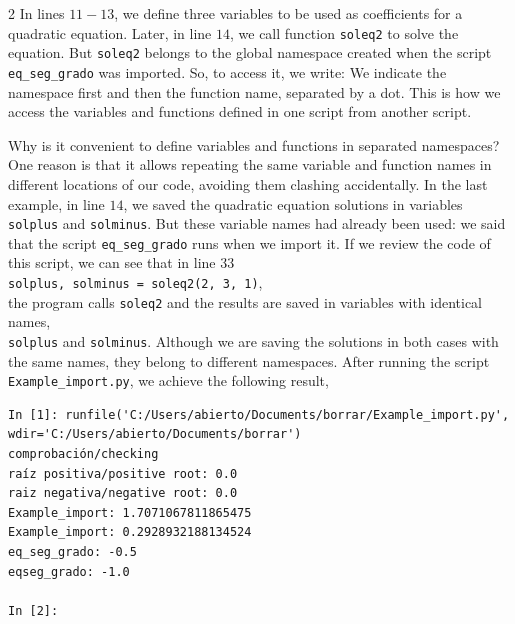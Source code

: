 \begin{paracol}{2}
In lines $11 - 13$, we define three variables to be used as coefficients for a quadratic equation. Later, in line $14$, we call function \texttt{soleq2} to solve the equation. But \texttt{soleq2} belongs to the global namespace created when the script \texttt{eq_seg_grado} was imported. So, to access it, we write:
We indicate the namespace first and then the function name, separated by a dot. This is how we access the variables and functions defined in one script from another script. 

Why is it convenient to define variables and functions in separated namespaces? One reason is that it allows repeating the same variable and function names in different locations of our code, avoiding them clashing accidentally. In the last example, in line $14$, we saved the quadratic equation solutions in variables \texttt{solplus} and \texttt{solminus}. But these variable names had already been used: we said that the script \texttt{eq_seg_grado} runs when we import it. If we review the code of this script, we can see that in line $33$\\ \texttt{solplus, solminus = soleq2(2, 3, 1)},\\ the program calls \texttt{soleq2} and the results are saved in variables with identical names,\\ \texttt{solplus} and \texttt{solminus}. Although we are saving the solutions in both cases with the same names, they belong to different namespaces. After running the script \texttt{Example_import.py}, we achieve the following result,   

\end{paracol}
\begin{verbatim}
In [1]: runfile('C:/Users/abierto/Documents/borrar/Example_import.py',
wdir='C:/Users/abierto/Documents/borrar')
comprobación/checking
raíz positiva/positive root: 0.0
raiz negativa/negative root: 0.0
Example_import: 1.7071067811865475
Example_import: 0.2928932188134524
eq_seg_grado: -0.5
eqseg_grado: -1.0

In [2]: 
\end{verbatim}

